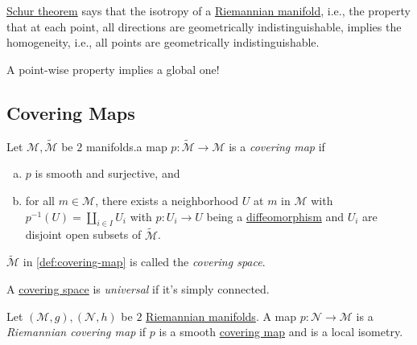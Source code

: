 \begin{remark}
	\hyperref[thm:Schur]{Schur theorem} says that the isotropy of a \hyperref[def:Riemannian-manifold]{Riemannian manifold}, i.e., the property that at each point, all directions are geometrically indistinguishable, implies the homogeneity, i.e., all points are geometrically indistinguishable.
\end{remark}

\begin{note}
	A point-wise property implies a global one!
\end{note}

\subsection{Covering Maps}
\begin{definition}\label{def:covering-map}
	Let \(\mathcal{M} , \widetilde{\mathcal{M}} \) be \(2\) manifolds.a map \(p\colon \widetilde{\mathcal{M}} \to \mathcal{M} \) is a \emph{covering map} if
	\begin{enumerate}[(a)]
		\item \(p\) is smooth and surjective, and
		\item for all \(m\in \mathcal{M} \), there exists a neighborhood \(U\) at \(m\) in \(\mathcal{M} \) with \(p ^{-1} (U) = \coprod_{i\in I} U_i\) with \(p\colon U_i \to U\) being a \hyperref[def:diffeomorphism]{diffeomorphism} and \(U_i\) are disjoint open subsets of \(\widetilde{\mathcal{M}} \).
	\end{enumerate}
\end{definition}

\begin{notation}\label{not:covering-space}
	\(\widetilde{\mathcal{M}} \) in \autoref{def:covering-map} is called the \emph{covering space}.
\end{notation}

\begin{notation}\label{not:universal-covering-space}
	A \hyperref[not:covering-space]{covering space} is \emph{universal}	if it's simply connected.
\end{notation}

\begin{definition}\label{def:Riemannian-covering-map}
	Let \((\mathcal{M} , g), (\mathcal{N}, h )\) be \(2\) \hyperref[def:Riemannian-manifold]{Riemannian manifolds}. A map \(p\colon \mathcal{N} \to \mathcal{M} \) is a \emph{Riemannian covering map} if \(p\) is a smooth \hyperref[def:covering-map]{covering map} and is a local isometry.
\end{definition}

